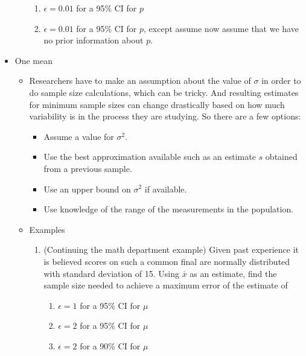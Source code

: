 \documentclass{article}
\begin{document}
\begin{itemize}
\begin{itemize}
\begin{enumerate}
            \item $\epsilon = 0.01$ for a 95\% CI for $p$\vspace{40pt}
            \item $\epsilon = 0.01$ for a 95\% CI for $p$, except assume now assume that we have no prior information about $p$.\vspace{40pt}
        \end{enumerate}
    \end{itemize}
    \item One mean\vspace{60pt}
    \begin{itemize}
        \item Researchers have to make an assumption about the value of $\sigma$ in order to do sample size calculations, which can be tricky. And resulting estimates for minimum sample sizes can change drastically based on how much variability is in the process they are studying. So there are a few options:
        \begin{itemize}
            \item Assume a value for $\sigma^2$.
            \item Use the best approximation available such as an estimate $s$ obtained from a previous sample.
            \item Use an upper bound on $\sigma^2$ if available.
            \item Use knowledge of the range of the measurements in the population.
        \end{itemize}\newpage
        \item Examples
        \begin{enumerate}
            \item (Continuing the math department example) Given past experience it is believed scores on such a common final are normally distributed with standard deviation of 15. Using $\bar{x}$ as an estimate, find the sample size needed to achieve a maximum error of the estimate of
            \begin{enumerate}
                \item $\epsilon = 1$ for a 95\% CI for $\mu$\vspace{40pt}
                \item $\epsilon = 2$ for a 95\% CI for $\mu$\vspace{40pt}
                \item $\epsilon = 2$ for a 90\% CI for $\mu$\vspace{40pt}

\end{enumerate}
\end{enumerate}
\end{itemize}
\end{itemize}
\end{document}
